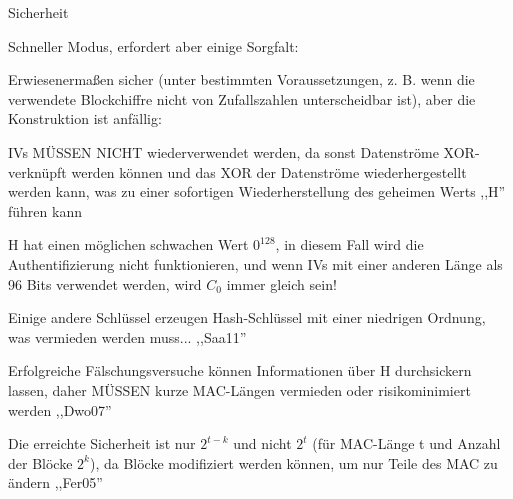 \documentclass[a4paper]{article}
\begin{document}
\begin{multicols}{3}
\begin{itemize*}
\begin{itemize*}
            \end{itemize*}
            \item Sicherheit
            \begin{itemize*}
                  \item Schneller Modus, erfordert aber einige Sorgfalt:
                  \item Erwiesenermaßen sicher (unter bestimmten Voraussetzungen, z. B. wenn die verwendete Blockchiffre nicht von Zufallszahlen unterscheidbar ist), aber die Konstruktion ist anfällig:
                  \item IVs MÜSSEN NICHT wiederverwendet werden, da sonst Datenströme XOR-verknüpft werden können und das XOR der Datenströme wiederhergestellt werden kann, was zu einer sofortigen Wiederherstellung des geheimen Werts ,,H'' führen kann
                  \item H hat einen möglichen schwachen Wert $0^{128}$, in diesem Fall wird die Authentifizierung nicht funktionieren, und wenn IVs mit einer anderen Länge als 96 Bits verwendet werden, wird $C_0$ immer gleich sein!
                  \item Einige andere Schlüssel erzeugen Hash-Schlüssel mit einer niedrigen Ordnung, was vermieden werden muss... ,,Saa11''
                  \item Erfolgreiche Fälschungsversuche können Informationen über H durchsickern lassen, daher MÜSSEN kurze MAC-Längen vermieden oder risikominimiert werden ,,Dwo07''
                  \item Die erreichte Sicherheit ist nur $2^{t-k}$ und nicht $2^t$ (für MAC-Länge t und Anzahl der Blöcke $2^k$), da Blöcke modifiziert werden können, um nur Teile des MAC zu ändern ,,Fer05''
            \end{itemize*}
      \end{itemize*}


\end{multicols}
\end{document}
